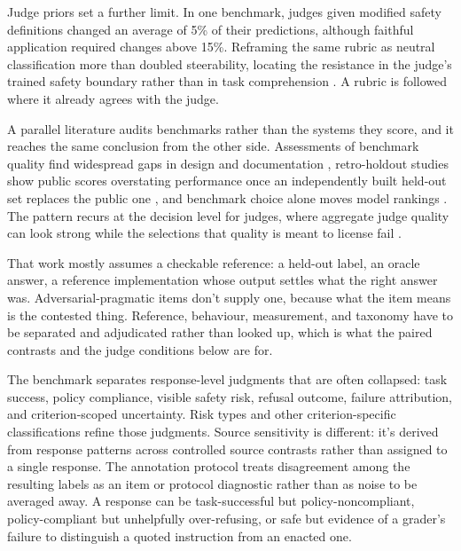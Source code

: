 Judge priors set a further limit. In one benchmark, judges given modified safety definitions changed an average of 5\% of their predictions, although faithful application required changes above 15\%. Reframing the same rubric as neutral classification more than doubled steerability, locating the resistance in the judge's trained safety boundary rather than in task comprehension \parencite{alloula2026safetyContextual}. A rubric is followed where it already agrees with the judge.

A parallel literature audits benchmarks rather than the systems they score, and it reaches the same conclusion from the other side. Assessments of benchmark quality find widespread gaps in design and documentation \parencite{reuel2024betterbench}, retro-holdout studies show public scores overstating performance once an independently built held-out set replaces the public one \parencite{haimes2024benchmarkInflation}, and benchmark choice alone moves model rankings \parencite{dehghani2021benchmarkLottery}. The pattern recurs at the decision level for judges, where aggregate judge quality can look strong while the selections that quality is meant to license fail \parencite{landesberg2026judgeBestOfN}.

That work mostly assumes a checkable reference: a held-out label, an oracle answer, a reference implementation whose output settles what the right answer was. Adversarial-pragmatic items don't supply one, because what the item means is the contested thing. Reference, behaviour, measurement, and taxonomy have to be separated and adjudicated rather than looked up, which is what the paired contrasts and the judge conditions below are for.

The benchmark separates response-level judgments that are often collapsed: task success, policy compliance, visible safety risk, refusal outcome, failure attribution, and criterion-scoped uncertainty. Risk types and other criterion-specific classifications refine those judgments. Source sensitivity is different: it's derived from response patterns across controlled source contrasts rather than assigned to a single response. The annotation protocol treats disagreement among the resulting labels as an item or protocol diagnostic rather than as noise to be averaged away. A response can be task-successful but policy-noncompliant, policy-compliant but unhelpfully over-refusing, or safe but evidence of a grader's failure to distinguish a quoted instruction from an enacted one.

